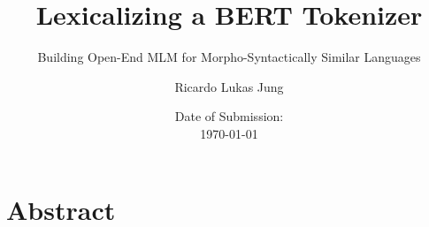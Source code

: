 \documentclass[12pt, a4paper, english]{ttlab-qualify}
\begin{document}
    \titlehead{
        Ricardo Lukas Jung\\
        6227492\\
        Empirische Sprachwissenschaft (B.A.)\\
        Phonetik \& Digital Humanities \\
        15\textsuperscript{th} Semester\\
        s2458588@stud.uni-frankfurt.de
    }
    \subject{Bachelor Thesis}
    \author{Ricardo Lukas Jung}
    \title{Lexicalizing a BERT Tokenizer}
    \subtitle{Building Open-End MLM for Morpho-Syntactically Similar Languages}
    \date{Date of Submission: \\\today}
    \publishers{Text Technology Lab\\Prof. Dr. Alexander Mehler\\Dr. Zakharia Pourtskhvanidze}

    \maketitle

    \cleardoublepage
    \addtocounter{page}{-1}
    \thispagestyle{empty}

    \chapter*{Abstract}
    \thispagestyle{empty}
    



    \cleardoubleoddpage
    \setcounter{page}{0}
    \tableofcontents
    \newpage
    \listoffigures
    \newpage
    \listoftables
    \newpage

    \newcommand{\sectionnumbering}[1]{%
        \setcounter{section}{0}%
        \renewcommand{\thesection}{\csname #1\endcsname{section}}%
    }
\end{document}
